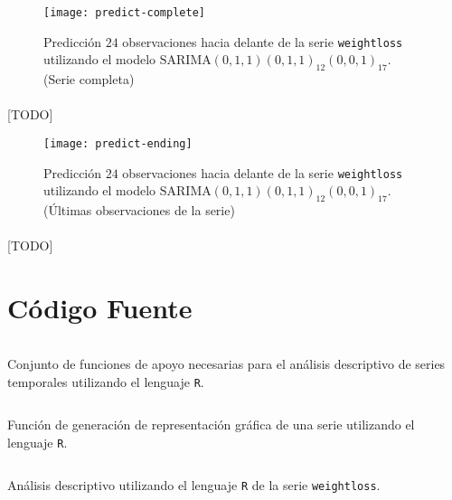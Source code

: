 \documentclass[a4paper, spanish]{article}
\begin{document}
    \begin{figure}[htb!]
      \centering
      \texttt{[image: predict-complete]}
      \caption{Predicción $24$ observaciones hacia delante de la serie \texttt{weightloss} utilizando el modelo $\text{SARIMA}(0, 1, 1)(0, 1, 1)_{12}(0, 0, 1)_{17}$. (Serie completa)}
      \label{img:predict_complete}
    \end{figure}

    \paragraph{}
    [TODO]

    \begin{figure}[htb!]
      \centering
      \texttt{[image: predict-ending]}
      \caption{Predicción $24$ observaciones hacia delante de la serie \texttt{weightloss} utilizando el modelo $\text{SARIMA}(0, 1, 1)(0, 1, 1)_{12}(0, 0, 1)_{17}$. (Últimas observaciones de la serie)}
      \label{img:predict_ending}
    \end{figure}

    \paragraph{}
    [TODO]

  \appendix
  \section{Código Fuente}
  \label{sec:code}

    \begin{listing}[H]
      \centering
      \inputminted{R}{./res/code/functions.r}
      \caption{Conjunto de funciones de apoyo necesarias para el análisis descriptivo de series temporales utilizando el lenguaje \texttt{R}.}
      \label{code:functions_r}
    \end{listing}

    \begin{listing}[H]
      \centering
      \inputminted{R}{./res/code/plotting.r}
      \caption{Función de generación de representación gráfica de una serie utilizando el lenguaje \texttt{R}.}
      \label{code:plotting_r}
    \end{listing}

    \begin{listing}[H]
      \centering
      \inputminted{R}{./res/code/descriptive.r}
      \caption{Análisis descriptivo utilizando el lenguaje \texttt{R} de la serie \texttt{weightloss}.}
      \label{code:descriptive_r}
    \end{listing}
\end{document}
